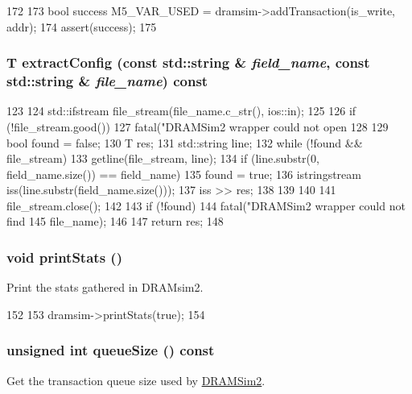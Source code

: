 \begin{DoxyCode}
172 {
173     bool success M5_VAR_USED = dramsim->addTransaction(is_write, addr);
174     assert(success);
175 }
\end{DoxyCode}
\hypertarget{classDRAMSim2Wrapper_aafb8a8238026119400ee0c470e3f7695}{
\subsubsection[{extractConfig}]{\setlength{\rightskip}{0pt plus 5cm}T extractConfig (const std::string \& {\em field\_\-name}, \/  const std::string \& {\em file\_\-name}) const}}
\label{classDRAMSim2Wrapper_aafb8a8238026119400ee0c470e3f7695}



\begin{DoxyCode}
123 {
124     std::ifstream file_stream(file_name.c_str(), ios::in);
125 
126     if (!file_stream.good())
127         fatal("DRAMSim2 wrapper could not open %
128 
129     bool found = false;
130     T res;
131     std::string line;
132     while (!found && file_stream) {
133         getline(file_stream, line);
134         if (line.substr(0, field_name.size()) == field_name) {
135             found = true;
136             istringstream iss(line.substr(field_name.size()));
137             iss >> res;
138         }
139     }
140 
141     file_stream.close();
142 
143     if (!found)
144         fatal("DRAMSim2 wrapper could not find %
145               file_name);
146 
147     return res;
148 }
\end{DoxyCode}
\hypertarget{classDRAMSim2Wrapper_a0beecd7e864561c9474bc80e993556bf}{
\subsubsection[{printStats}]{\setlength{\rightskip}{0pt plus 5cm}void printStats ()}}
\label{classDRAMSim2Wrapper_a0beecd7e864561c9474bc80e993556bf}
Print the stats gathered in DRAMsim2. 


\begin{DoxyCode}
152 {
153     dramsim->printStats(true);
154 }
\end{DoxyCode}
\hypertarget{classDRAMSim2Wrapper_a667ea9ca9654bced2242c6ccd77599ee}{
\subsubsection[{queueSize}]{\setlength{\rightskip}{0pt plus 5cm}unsigned int queueSize () const}}
\label{classDRAMSim2Wrapper_a667ea9ca9654bced2242c6ccd77599ee}
Get the transaction queue size used by \hyperlink{classDRAMSim2}{DRAMSim2}.

